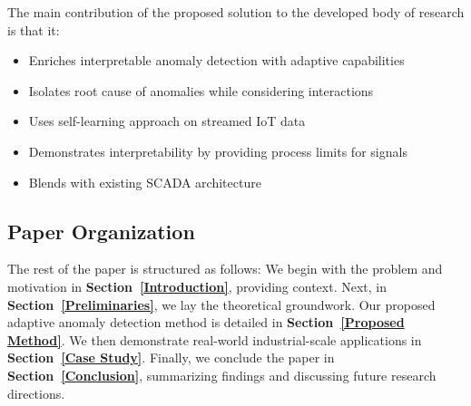 The main contribution of the proposed solution to the developed body of research is that it:
\begin{itemize}
\item Enriches interpretable anomaly detection with adaptive capabilities
\item Isolates root cause of anomalies while considering interactions
\item Uses self-learning approach on streamed IoT data
\item Demonstrates interpretability by providing process limits for signals
\item Blends with existing SCADA architecture
\end{itemize}

\subsection{Paper Organization}
The rest of the paper is structured as follows: We begin with the problem and motivation in \textbf{Section~\ref{Introduction}}, providing context. Next, in \textbf{Section~\ref{Preliminaries}}, we lay the theoretical groundwork. Our proposed adaptive anomaly detection method is detailed in \textbf{Section~\ref{Proposed Method}}. We then demonstrate real-world industrial-scale applications in \textbf{Section~\ref{Case Study}}. Finally, we conclude the paper in \textbf{Section~\ref{Conclusion}}, summarizing findings and discussing future research directions.


